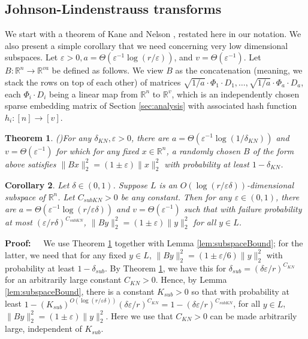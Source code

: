 \documentclass{sig-alternate}
\newcommand\vk{1/a}
\newcommand\kv{a}
\newcommand\gdelta{\delta}
\newcommand{\eps}{\varepsilon}
\newtheorem{theorem}{Theorem}
\newtheorem{corollary}[theorem]{Corollary}
\def\FullBox{\hbox{\vrule width 8pt height 8pt depth 0pt}}
\def\qed{\ifmmode\qquad\FullBox\else{\unskip\nobreak\hfil
\penalty50\hskip1em\null\nobreak\hfil\FullBox
\parfillskip=0pt\finalhyphendemerits=0\endgraf}\fi}
\newenvironment{proof}{\begin{trivlist} \item {\bf Proof:~~}}
  {\qed\end{trivlist}}
\begin{document}
\subsection{Johnson-Lindenstrauss transforms}
We start with a theorem of Kane and Nelson \cite{KN12}, restated here in our notation. We also
present a simple corollary that we need concerning very low dimensional subspaces. 
Let $\eps > 0, \kv = \Theta(\eps^{-1} \log (r/\eps))$, and $v = \Theta(\eps^{-1})$.
Let $B:\mathbb{R}^n \rightarrow \mathbb{R}^{v\kv}$ be defined as follows. 
We view $B$ as the concatenation (meaning, we stack the rows on top of each other) 
of matrices $\sqrt{\vk} \cdot \Phi_1 \cdot D_1, \ldots, \sqrt{\vk} \cdot \Phi_{\kv} \cdot D_{\kv}$, 
each $\Phi_i \cdot D_i$
being a linear map from $\mathbb{R}^n$ to $\mathbb{R}^v$, which is an independently
chosen sparse embedding matrix of Section \ref{sec:analysis} with
associated hash function $h_i:[n] \rightarrow [v]$. 
\begin{theorem}(\cite{KN12})\label{thm:general}
For any $\delta_{KN}, \eps > 0$,
there are $\kv = \Theta(\eps^{-1} \log (1/\delta_{KN}))$ and $v = \Theta(\eps^{-1})$
for which for any fixed $x \in \mathbb{R}^n$, a randomly chosen $B$ of the form above satisfies
$\|Bx\|_2^2 = (1 \pm \eps) \|x\|_2^2$ with probability at least $1-\delta_{KN}$. 
\end{theorem}
\begin{corollary}\label{cor:subspace}
Let $\gdelta\in (0,1)$.
Suppose $L$ is an $O(\log (r/\eps\gdelta))$-dimensional subspace of $\mathbb{R}^n$.
Let $C_{subKN} > 0$ be any constant.
Then for any $\eps\in (0,1)$, there 
are $\kv = \Theta(\eps^{-1} \log (r/\eps\gdelta))$ and $v = \Theta(\eps^{-1})$ 
such that with failure probability at most 
 $(\eps/r\gdelta)^{C_{subKN}}$, $\|By\|_2^2 = (1 \pm \eps) \|y\|_2^2$ for all $y \in L$.
\end{corollary}
\begin{proof}
We use Theorem \ref{thm:general} together with Lemma \ref{lem:subspaceBound};
for the latter, we need that for any fixed $y \in L$, $\|By\|_2^2 = (1 \pm \eps/6)\|y\|_2^2$ with probability at least
$1-\delta_{sub}$. By Theorem \ref{thm:general}, we have this for $\delta_{sub} = (\gdelta\eps/r)^{C_{KN}}$ for an arbitrarily large constant $C_{KN} > 0$.
Hence, by Lemma \ref{lem:subspaceBound}, there is a constant $K_{sub} > 0$ 
so that with probability at least
$1-(K_{sub})^{O(\log (r/\eps\gdelta))} (\gdelta\eps/r)^{C_{KN}}= 1 - (\gdelta\eps/r)^{C_{subKN}}$,
for all $y \in L$, 
$\|By\|_2^2 = (1 \pm \eps) \|y\|_2^2$. Here we use that $C_{KN} > 0$ can be made arbitrarily large, independent of $K_{sub}$. 
\end{proof} 
\end{document}
